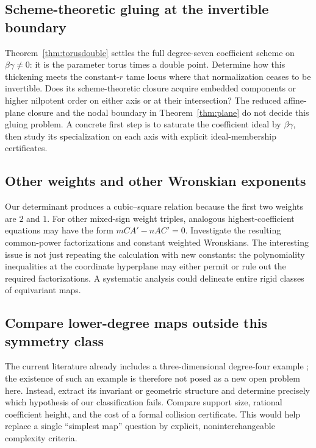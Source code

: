\documentclass[11pt,a4paper]{article}
\numberwithin{equation}{section}
\theoremstyle{definition}
\theoremstyle{remark}
\begin{document}
\subsection{Scheme-theoretic gluing at the invertible boundary}

Theorem~\ref{thm:torusdouble} settles the full degree-seven coefficient
scheme on $\beta\gamma\ne0$: it is the parameter torus times a double
point. Determine how this thickening meets the constant-$r$ tame locus
where that normalization ceases to be invertible. Does its scheme-theoretic
closure acquire embedded components or higher nilpotent order on either
axis or at their intersection? The reduced affine-plane closure and the
nodal boundary in Theorem~\ref{thm:plane} do not decide this gluing problem.
A concrete first step is to saturate the coefficient ideal by
$\beta\gamma$, then study its specialization on each axis with explicit
ideal-membership certificates.

\subsection{Other weights and other Wronskian exponents}

Our determinant produces a cubic--square relation because the first two
weights are $2$ and $1$. For other mixed-sign weight triples, analogous
highest-coefficient equations may have the form
$mCA'-nAC'=0$. Investigate the resulting common-power factorizations and
constant weighted Wronskians. The interesting issue is not just repeating
the calculation with new constants: the polynomiality inequalities at the
coordinate hyperplane may either permit or rule out the required
factorizations. A systematic analysis could delineate entire rigid classes
of equivariant maps.

\subsection{Compare lower-degree maps outside this symmetry class}

The current literature already includes a three-dimensional degree-four
example \cite{gao}; the existence of such an example is therefore not
posed as a new open problem here. Instead, extract its invariant or
geometric structure and determine precisely which hypothesis of our
classification fails. Compare support size, rational coefficient height,
and the cost of a formal collision certificate. This would help replace a
single ``simplest map'' question by explicit, noninterchangeable complexity
criteria.
\end{document}
